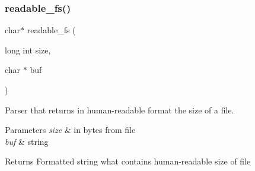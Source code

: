 \mbox{\label{fileserv_8c_acb8985a720cf17b68e99872ba793f2cc}} 
\subsubsection{readable\+\_\+fs()}
{\footnotesize\ttfamily char$\ast$ readable\+\_\+fs (\begin{DoxyParamCaption}\item[{long int}]{size,  }\item[{char $\ast$}]{buf }\end{DoxyParamCaption})}



Parser that returns in human-\/readable format the size of a file. 


\begin{DoxyParams}{Parameters}
{\em size} & in bytes from file \\
\hline
{\em buf} & string \\
\hline
\end{DoxyParams}
\begin{DoxyReturn}{Returns}
Formatted string what contains human-\/readable size of file 
\end{DoxyReturn}
